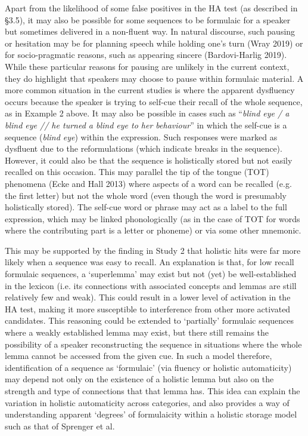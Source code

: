 \documentclass[12pt]{article}
\newenvironment{styleStandard}{\setlength\leftskip{0cm}\setlength\rightskip{0cm plus 1fil}\setlength\parindent{0cm}\setlength\parfillskip{0pt plus 1fil}\setlength\parskip{0in plus 1pt}\writerlistparindent\writerlistleftskip\leavevmode\normalfont\normalsize\writerlistlabel\ignorespaces}{\unskip\vspace{0.111in plus 0.0111in}\par}
\newcommand\writerlistleftskip{}
\newcommand\writerlistparindent{}
\newcommand\writerlistlabel{}
\begin{document}
\begin{styleStandard}
Apart from the likelihood of some false positives in the HA test (as described in §3.5), it may also be possible for some sequences to be formulaic for a speaker but sometimes delivered in a non-fluent way. In natural discourse, such pausing or hesitation may be for planning speech while holding one’s turn (Wray 2019) or for socio-pragmatic reasons, such as appearing sincere (Bardovi-Harlig 2019). While these particular reasons for pausing are unlikely in the current context, they do highlight that speakers may choose to pause within formulaic material. A more common situation in the current studies is where the apparent dysfluency occurs because the speaker is trying to self-cue their recall of the whole sequence, as in Example 2 above. It may also be possible in cases such as “\textit{blind eye / a blind eye // he turned a blind eye to her behaviour}” in which the self-cue is a sequence (\textit{blind eye}) within the expression. Such responses were marked as dysfluent due to the reformulations (which indicate breaks in the sequence). However, it could also be that the sequence is holistically stored but not easily recalled on this occasion. This may parallel the tip of the tongue (TOT) phenomena (Ecke and Hall 2013) where aspects of a word can be recalled (e.g. the first letter) but not the whole word (even though the word is presumably holistically stored). The self-cue word or phrase may act as a label to the full expression, which may be linked phonologically (as in the case of TOT for words where the contributing part is a letter or phoneme) or via some other mnemonic. 
\end{styleStandard}

\begin{styleStandard}
This may be supported by the finding in Study 2 that holistic hits were far more likely when a sequence was easy to recall. An explanation is that, for low recall formulaic sequences, a ‘superlemma’ may exist but not (yet) be well-established in the lexicon (i.e. its connections with associated concepts and lemmas are still relatively few and weak). This could result in a lower level of activation in the HA test, making it more susceptible to interference from other more activated candidates. This reasoning could be extended to ‘partially’ formulaic sequences where a weakly established lemma may exist, but there still remains the possibility of a speaker reconstructing the sequence in situations where the whole lemma cannot be accessed from the given cue. In such a model therefore, identification of a sequence as ‘formulaic’ (via fluency or holistic automaticity) may depend not only on the existence of a holistic lemma but also on the strength and type of connections that that lemma has. This idea can explain the variation in holistic automaticity across categories, and also provides a way of understanding apparent ‘degrees’ of formulaicity within a holistic storage model such as that of Sprenger et al. 
\end{styleStandard}
\end{document}

